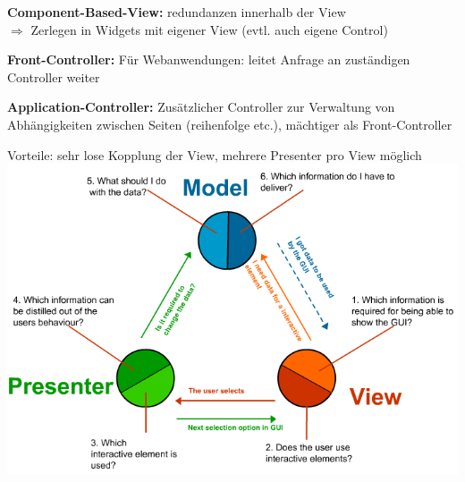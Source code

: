 \textbf{Component-Based-View:} redundanzen innerhalb der View \\ $\Rightarrow$ Zerlegen in Widgets mit eigener View (evtl. auch eigene Control)


\textbf{Front-Controller:} Für Webanwendungen: leitet Anfrage an zuständigen Controller weiter


\textbf{Application-Controller:} Zusätzlicher Controller zur Verwaltung von Abhängigkeiten zwischen Seiten (reihenfolge etc.), mächtiger als Front-Controller

Vorteile: sehr lose Kopplung der View, mehrere Presenter pro View möglich\\
\includegraphics[height=0.46\textheight]{MVP}\\\\


